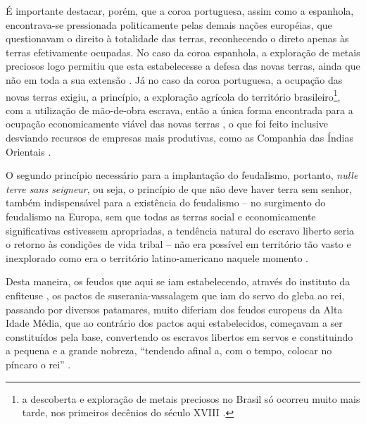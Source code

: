 \documentclass[
	12pt,				%
	oneside,			%
	a4paper,			%
	chapter=TITLE,		%
	section=TITLE,		%
	english,			%
	brazil				%
	]{abntex2}
\begin{document}
\begin{refsection}
É importante destacar, porém, que a coroa portuguesa, assim como a espanhola,
encontrava-se pressionada politicamente pelas demais nações européias, que
questionavam o direito à totalidade das terras, reconhecendo o direto apenas às
terras efetivamente ocupadas. No caso da coroa espanhola, a exploração de metais
preciosos logo permitiu que esta estabelecesse a defesa das novas terras, ainda
que não em toda a sua extensão \autocite[p.~13]{furtado2005}. Já no caso da coroa
portuguesa, a ocupação das novas terras exigiu, a princípio, a exploração
agrícola do território brasileiro\footnote{a descoberta e exploração de metais preciosos no Brasil só ocorreu muito
  mais tarde, nos primeiros decênios do século XVIII \autocite[p.~79]{furtado2005}.}, com a utilização de mão-de-obra escrava,
então a única forma encontrada para a ocupação economicamente viável das novas
terras \autocite[p.~17]{furtado2005}, o que foi feito inclusive desviando recursos de
empresas mais produtivas, como as Companhia das Índias Orientais \autocite[
p.~12]{furtado2005}.

O segundo princípio necessário para a implantação do feudalismo, portanto,
\emph{nulle terre sans seigneur}, ou seja, o princípio de que não deve haver terra
sem senhor, também indispensável para a existência do feudalismo -- no
surgimento do feudalismo na Europa, sem que todas as terras social e
economicamente significativas estivessem apropriadas, a tendência natural do
escravo liberto seria o retorno às condições de vida tribal -- não era possível
em território tão vasto e inexplorado como era o território latino-americano
naquele momento \autocite[726]{rangel1989}.

Desta maneira, os feudos que aqui se iam estabelecendo, através do instituto da
enfiteuse \autocite[726]{rangel1989}, os pactos de suserania-vassalagem que iam do servo
do gleba ao rei, passando por diversos patamares, muito diferiam dos feudos
europeus da Alta Idade Média, que ao contrário dos pactos aqui estabelecidos,
começavam a ser constituídos pela base, convertendo os escravos libertos em
servos e constituindo a pequena e a grande nobreza, ``tendendo afinal a, com o
tempo, colocar no píncaro o rei'' \autocite[727]{rangel1989}.


\end{refsection}
\end{document}

